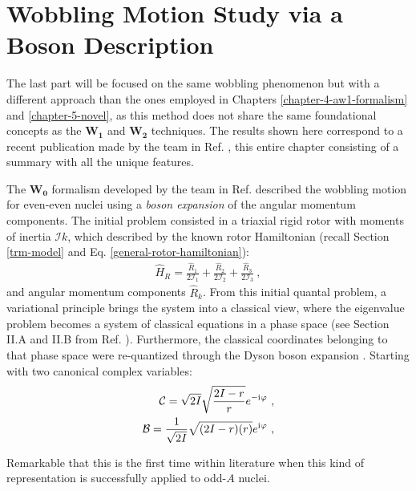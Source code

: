 \chapter{Wobbling Motion Study via a Boson Description}
\label{extra-chapter-new-boson}

The last part will be focused on the same wobbling phenomenon but with a different approach than the ones employed in Chapters \ref{chapter-4-aw1-formalism} and \ref{chapter-5-novel}, as this method does not share the same foundational concepts as the $\mathbf{W_1}$ and $\mathbf{W_2}$ techniques. The results shown here correspond to a recent publication made by the team in Ref. \cite{raduta2020new}, this entire chapter consisting of a summary with all the unique features.

The $\mathbf{W_0}$ formalism developed by the team in Ref. \cite{raduta2017semiclassical} described the wobbling motion for even-even nuclei using a \emph{boson expansion} of the angular momentum components. The initial problem consisted in a triaxial rigid rotor with moments of inertia $\mathcal{I}k$, which described by the known rotor Hamiltonian (recall Section \ref{trm-model} and Eq. \ref{general-rotor-hamiltonian}):
\begin{align}
    \hat{H}_R=\frac{\hat{R}_1}{2\mathcal{I}_1}+\frac{\hat{R}_2}{2\mathcal{I}_2}+\frac{\hat{R}_3}{2\mathcal{I}_3}\ ,
\end{align}
and angular momentum components $\hat{R}_k$. From this initial quantal problem, a variational principle brings the system into a classical view, where the eigenvalue problem becomes a system of classical equations in a phase space (see Section II.A and II.B from Ref. \cite{raduta2017semiclassical}). Furthermore, the classical coordinates belonging to that phase space were re-quantized through the Dyson boson expansion \cite{dyson1956general}. Starting with two canonical complex variables:
\begin{align}
    \mathcal{C}=\sqrt{2I}\sqrt{\frac{2I-r}{r}}e^{-\iu\varphi}\ ,\nonumber\\
    \mathcal{B}=\frac{1}{\sqrt{2I}}\sqrt{(2I-r)(r)}e^{\iu\varphi}\ ,
\end{align} 


Remarkable that this is the first time within literature when this kind of representation is successfully applied to odd-$A$ nuclei.